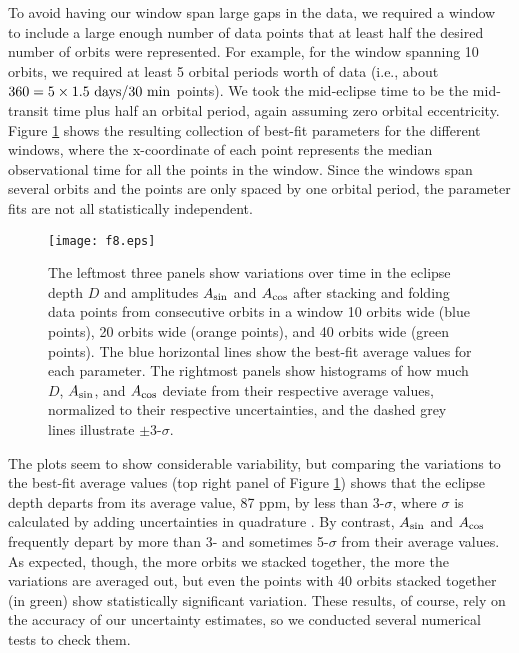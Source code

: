 \documentclass[manuscript]{aastex62}
\begin{document}
To avoid having our window span large gaps in the data, we required a window to include a large enough number of data points that at least half the desired number of orbits were represented. For example, for the window spanning 10 orbits, we required at least 5 orbital periods worth of data (i.e., about $360 = 5 \times 1.5\ {\rm days}/30\ {\rm min}$ points). We took the mid-eclipse time to be the mid-transit time plus half an orbital period, again assuming zero orbital eccentricity. Figure \ref{fig:planet-phase-curve-var_Analysis_of_Kepler76b} shows the resulting collection of best-fit parameters for the different windows, where the x-coordinate of each point represents the median observational time for all the points in the window. Since the windows span several orbits and the points are only spaced by one orbital period, the parameter fits are not all statistically independent.

\begin{figure}
\texttt{[image: f8.eps]}
\caption{The leftmost three panels show variations over time in the eclipse depth $D$ and amplitudes $A_{\rm sin}$ and $A_{\rm cos}$ after stacking and folding data points from consecutive orbits in a window 10 orbits wide (blue points), 20 orbits wide (orange points), and 40 orbits wide (green points). The blue horizontal lines show the best-fit average values for each parameter. The rightmost panels show histograms of how much $D$, $A_{\rm sin}$, and $A_{\rm cos}$ deviate from their respective average values, normalized to their respective uncertainties, and the dashed grey lines illustrate $\pm$3-$\sigma$. \label{fig:planet-phase-curve-var_Analysis_of_Kepler76b}}
\end{figure}

The plots seem to show considerable variability, but comparing the variations to the best-fit average values (top right panel of Figure \ref{fig:planet-phase-curve-var_Analysis_of_Kepler76b}) shows that the eclipse depth departs from its average value, 87 ppm, by less than 3-$\sigma$, where $\sigma$ is calculated by adding uncertainties in quadrature \citep[p.~58]{1997ieas.book.....T}. By contrast, $A_{\rm sin}$ and $A_{\rm cos}$ frequently depart by more than 3- and sometimes 5-$\sigma$ from their average values. As expected, though, the more orbits we stacked together, the more the variations are averaged out, but even the points with 40 orbits stacked together (in green) show statistically significant variation. These results, of course, rely on the accuracy of our uncertainty estimates, so we conducted several numerical tests to check them. 
\end{document}

